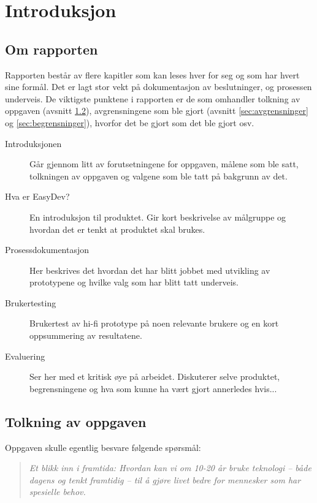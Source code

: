 \chapter{Introduksjon}

\section{Om rapporten}
Rapporten består av flere kapitler som kan leses hver for seg og som har hvert sine formål. Det er lagt stor vekt på dokumentasjon av beslutninger, og prosessen underveis. 
De viktigste punktene i rapporten er de som omhandler tolkning av oppgaven (avsnitt \ref{sec:tolkning}), avgrensningene som ble gjort (avsnitt \ref{sec:avgrensninger} og \ref{sec:begrensninger}), hvorfor det be gjort som det ble gjort osv. 

\begin{description}

\item[Introduksjonen] Går gjennom litt av forutsetningene for oppgaven, målene som ble satt, tolkningen av oppgaven og valgene som ble tatt på bakgrunn av det. 

\item[Hva er EasyDev?] En introduksjon til produktet. Gir kort beskrivelse av målgruppe og hvordan det er tenkt at produktet skal brukes.

\item[Prosessdokumentasjon] Her beskrives det hvordan det har blitt jobbet med utvikling av prototypene og hvilke valg som har blitt tatt underveis.

\item[Brukertesting] Brukertest av hi-fi prototype på noen relevante brukere og en kort oppsummering av resultatene.

\item[Evaluering] Ser her med et kritisk øye på arbeidet. Diskuterer selve produktet, begrensningene og hva som kunne ha vært gjort annerledes hvis...

\end{description}



\section{Tolkning av oppgaven} \label{sec:tolkning}
Oppgaven skulle egentlig besvare følgende spørsmål: 
\begin{quote}
\textit{Et	blikk	inn	i	framtida:	Hvordan	kan	vi	om	10-20	år	bruke	teknologi	
– både	dagens	og	tenkt	framtidig	– til	å	gjøre	livet	bedre	for	
mennesker	som	har	spesielle behov.}
\end{quote}

